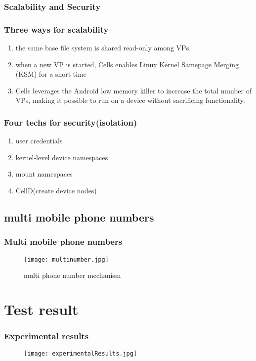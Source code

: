 \documentclass[utf8]{beamer}
\begin{document}
\subsubsection{Scalability and Security}
\begin{frame}
\frametitle{Three ways for scalability}
\begin{enumerate}
\item<+-> the same base file system is shared read-only among VPs.
\item<+-> when a new VP is started, Cells enables Linux Kernel Samepage Merging (KSM) for a short time
\item<+-> Cells leverages the Android low memory killer to increase the total number of VPs, making it possible to run on a device without sacrificing functionality.
\end{enumerate}
\end{frame}

\begin{frame}
\frametitle{Four techs for security(isolation)}
\begin{enumerate}
\item<+-> user credentials
\item<+-> kernel-level device namespaces
\item<+-> mount namespaces
\item<+-> CellD(create device nodes)
\end{enumerate}
\end{frame}

\subsection{multi mobile phone numbers}
\begin{frame}
\frametitle{Multi mobile phone numbers}
\begin{figure}
\begin{center}
\texttt{[image: multinumber.jpg]}
\end{center}
\caption{multi phone number mechanism}
\end{figure}
\end{frame}

\section{Test result}
\begin{frame}
\frametitle{Experimental results}
\begin{figure}
\begin{center}
\texttt{[image: experimentalResults.jpg]}
\end{center}
\end{figure}
\end{frame}
\end{document}
